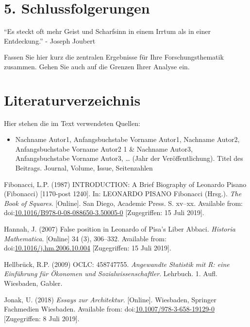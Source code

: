 \documentclass[ngerman,]{article}
\providecommand{\tightlist}{%
  \setlength{\itemsep}{0pt}\setlength{\parskip}{0pt}}
\begin{document}
\section{5. Schlussfolgerungen}\label{schlussfolgerungen}

``Es steckt oft mehr Geist und Scharfsinn in einem Irrtum als in einer
Entdeckung.'' - Joseph Joubert

Fassen Sie hier kurz die zentralen Ergebnisse für Ihre
Forschungsthematik zusammen. Gehen Sie auch auf die Grenzen Ihrer
Analyse ein.

\section{Literaturverzeichnis}\label{literaturverzeichnis}

Hier stehen die im Text verwendeten Quellen:

\begin{itemize}
\tightlist
\item
  Nachname Autor1, Anfangsbuchstabe Vorname Autor1, Nachname Autor2,
  Anfangsbuchstabe Vorname Autor2 1 \& Nachname Autor3, Anfangsbuchstabe
  Vorname Autor3, \ldots{} (Jahr der Veröffentlichung). Titel des
  Beitrags. Journal, Volume, Issue, Seitenzahlen
\end{itemize}

\hypertarget{refs}{}
\hypertarget{ref-fibonacci_introduction:_1987}{}
Fibonacci, L.P. (1987) INTRODUCTION: A Brief Biography of Leonardo
Pisano (Fibonacci) {[}1170-post 1240{]}. In: LEONARDO PISANO Fibonacci
(Hrsg.). \emph{The Book of Squares}. {[}Online{]}. San Diego, Academic
Press. S. xv--xx. Available from:
doi:\href{https://doi.org/10.1016/B978-0-08-088650-3.50005-0}{10.1016/B978-0-08-088650-3.50005-0}
{[}Zugegriffen: 15 Juli 2019{]}.

\hypertarget{ref-hannah_false_2007}{}
Hannah, J. (2007) False position in Leonardo of Pisa's Liber Abbaci.
\emph{Historia Mathematica}. {[}Online{]} 34 (3), 306--332. Available
from:
doi:\href{https://doi.org/10.1016/j.hm.2006.10.004}{10.1016/j.hm.2006.10.004}
{[}Zugegriffen: 15 Juli 2019{]}.

\hypertarget{ref-hellbruck_angewandte_2009}{}
Hellbrück, R.P. (2009) OCLC: 458747755. \emph{Angewandte Statistik mit
R: eine Einführung für Ökonomen und Sozialwissenschaftler}. Lehrbuch. 1.
Aufl. Wiesbaden, Gabler.

\hypertarget{ref-jonak_essays_2018}{}
Jonak, U. (2018) \emph{Essays zur Architektur}. {[}Online{]}. Wiesbaden,
Springer Fachmedien Wiesbaden. Available from:
doi:\href{https://doi.org/10.1007/978-3-658-19129-0}{10.1007/978-3-658-19129-0}
{[}Zugegriffen: 8 Juli 2019{]}.
\end{document}

